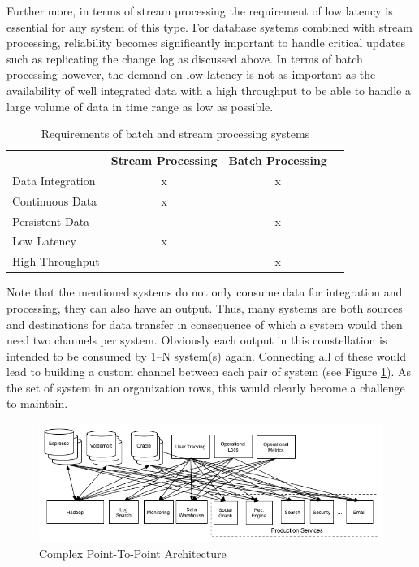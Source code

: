 Further more, in terms of stream processing the requirement of low latency is
essential for any system of this type. For database systems combined with stream
processing, reliability becomes significantly important to handle critical updates 
such as replicating the change log as discussed above.
In terms of batch processing however, the demand on low latency is not as
important as the availability of well integrated data with a high throughput to
be able to handle a large volume of data in time range as low as possible.

\begin{table}[H]
\centering
\begin{tabular}{l|c|cl}
\multicolumn{1}{c|}{\textbf{}} & \textbf{Stream Processing} & \textbf{Batch
Processing} & \multicolumn{1}{c}{\textbf{}} \\ \cline{1-3}
Data Integration               & x                          & x
&                               \\
Continuous Data                & x                          &
&                               \\
Persistent Data                &                            & x
&                               \\
Low Latency                    & x                          &
&                               \\
High Throughput                     &                            & x
&
\end{tabular}
\caption{Requirements of batch and stream processing systems}
\label{table:requirements-batch-stream}
\end{table}

Note that the mentioned systems do not only consume data for integration and
processing, they can also have an output. Thus, many systems are both sources and
destinations for data transfer in consequence of which a system would then need
two channels  per system. 
Obviously each output in this constellation is intended to be consumed by 1--N
system(s) again. Connecting all of these would lead to building a custom
channel between each pair of system (see Figure \ref{fig:datapipeline_complex}). As the set of system in an organization
rows, this would clearly become a challenge to maintain.

\begin{figure}[H]
    \centering
    \includegraphics[width=1.0\textwidth]{images/datapipeline_complex.png}
    \caption{Complex Point-To-Point Architecture}
    \label{fig:datapipeline_complex}
\end{figure}

